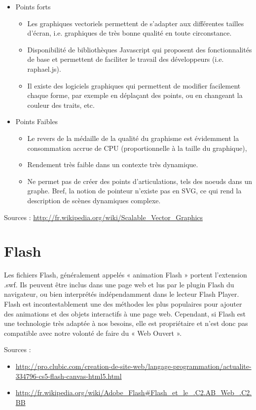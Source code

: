\documentclass[a4paper,10pt]{report}
\begin{document}
\begin{itemize}
\item Points forts
\begin{itemize}
\item Les graphiques vectoriels permettent de s'adapter aux différentes tailles d'écran, 
i.e. graphiques de très bonne qualité en toute circonstance.
\item Disponibilité de bibliothèques Javascript qui proposent des fonctionnalités de base 
et permettent de faciliter le travail des développeurs (i.e. raphael.js).
\item Il existe des logiciels graphiques qui permettent de modifier facilement chaque
 forme, par exemple en déplaçant des points, ou en changeant la couleur des traits, etc.
\end{itemize}
\item Points Faibles
\begin{itemize}
\item Le revers de la médaille de la qualité du graphisme est évidemment la consommation 
accrue de CPU (proportionnelle à la taille du graphique),
\item Rendement très faible dans un contexte très dynamique.
\item Ne permet pas de créer des points d'articulations, tels des noeuds dans un graphe. 
Bref, la notion de pointeur n'existe pas en SVG, ce qui rend la description de scènes 
dynamiques complexe.
\end{itemize} 
\end{itemize} 

Sources : \url{http://fr.wikipedia.org/wiki/Scalable_Vector_Graphics}

\section{Flash}
Les fichiers Flash, généralement appelés « animation Flash » portent l'extension .swf. 
Ils peuvent être inclus dans une page web et lus par le plugin Flash du navigateur, ou 
bien interprétés indépendamment dans le lecteur Flash Player. Flash est incontestablement 
une des méthodes les plus populaires pour ajouter des animations et des objets
 interactifs à une page web. 
Cependant, si Flash est une technologie très adaptée à nos besoins, elle est propriétaire
 et n'est donc pas compatible avec notre volonté de faire du « Web Ouvert ».
 
Sources : 

\begin{itemize}
  \item \url{http://pro.clubic.com/creation-de-site-web/langage-programmation/actualite-334796-cs5-flash-canvas-html5.html}
  \item \url{http://fr.wikipedia.org/wiki/Adobe_Flash#Flash_et_le_.C2.AB_Web_.C2.BB}
\end{itemize}
\end{document}
